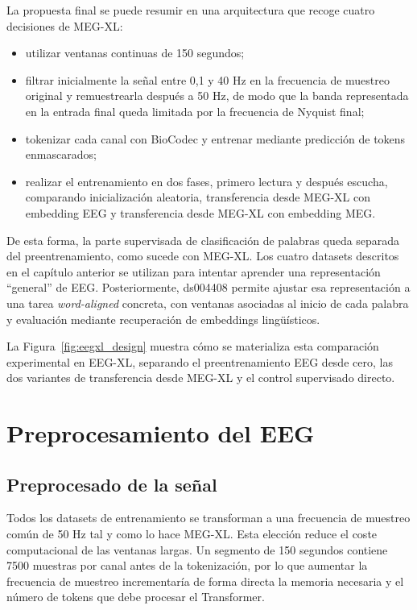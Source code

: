La propuesta final se puede resumir en una arquitectura que recoge cuatro decisiones de MEG-XL:

\begin{itemize}
\setlength{\itemsep}{0pt}
\setlength{\parsep}{0pt}
\setlength{\topsep}{2pt}
\setlength{\partopsep}{0pt}
\item utilizar ventanas continuas de 150 segundos;
\item filtrar inicialmente la señal entre 0,1 y 40 Hz en la frecuencia de muestreo original y remuestrearla después a 50 Hz, de modo que la banda representada en la entrada final queda limitada por la frecuencia de Nyquist final;
\item tokenizar cada canal con BioCodec y entrenar mediante predicción de tokens enmascarados;
\item realizar el entrenamiento en dos fases, primero lectura y después escucha, comparando inicialización aleatoria, transferencia desde MEG-XL con embedding EEG y transferencia desde MEG-XL con embedding MEG.
\end{itemize}

De esta forma, la parte supervisada de clasificación de palabras queda separada del preentrenamiento, como sucede con MEG-XL. Los cuatro datasets descritos en el capítulo anterior se utilizan para intentar aprender una representación ``general'' de EEG. Posteriormente, ds004408 permite ajustar esa representación a una tarea \textit{word-aligned} concreta, con ventanas asociadas al inicio de cada palabra y evaluación mediante recuperación de embeddings lingüísticos.

La Figura~\ref{fig:eegxl_design} muestra cómo se materializa esta comparación experimental en EEG-XL, separando el preentrenamiento EEG desde cero, las dos variantes de transferencia desde MEG-XL y el control supervisado directo.



\section{Preprocesamiento del EEG}

\subsection{Preprocesado de la señal}

Todos los datasets de entrenamiento se transforman a una frecuencia de muestreo común de 50 Hz tal y como lo hace MEG-XL. Esta elección reduce el coste computacional de las ventanas largas. Un segmento de 150 segundos contiene 7500 muestras por canal antes de la tokenización, por lo que aumentar la frecuencia de muestreo incrementaría de forma directa la memoria necesaria y el número de tokens que debe procesar el Transformer.

